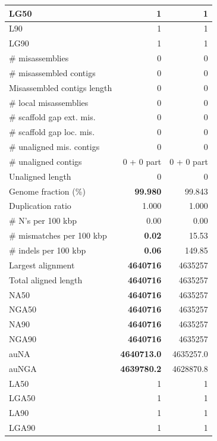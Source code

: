 \documentclass[12pt,a4paper]{article}
\begin{document}
\begin{table}[ht]
\begin{center}
\begin{tabular}{|l*{2}{|r}|}
LG50 & 1 & 1 \\ \hline
L90 & 1 & 1 \\ \hline
LG90 & 1 & 1 \\ \hline
\# misassemblies & 0 & 0 \\ \hline
\# misassembled contigs & 0 & 0 \\ \hline
Misassembled contigs length & 0 & 0 \\ \hline
\# local misassemblies & 0 & 0 \\ \hline
\# scaffold gap ext. mis. & 0 & 0 \\ \hline
\# scaffold gap loc. mis. & 0 & 0 \\ \hline
\# unaligned mis. contigs & 0 & 0 \\ \hline
\# unaligned contigs & 0 + 0 part & 0 + 0 part \\ \hline
Unaligned length & 0 & 0 \\ \hline
Genome fraction (\%) & {\bf 99.980} & 99.843 \\ \hline
Duplication ratio & 1.000 & 1.000 \\ \hline
\# N's per 100 kbp & 0.00 & 0.00 \\ \hline
\# mismatches per 100 kbp & {\bf 0.02} & 15.53 \\ \hline
\# indels per 100 kbp & {\bf 0.06} & 149.85 \\ \hline
Largest alignment & {\bf 4640716} & 4635257 \\ \hline
Total aligned length & {\bf 4640716} & 4635257 \\ \hline
NA50 & {\bf 4640716} & 4635257 \\ \hline
NGA50 & {\bf 4640716} & 4635257 \\ \hline
NA90 & {\bf 4640716} & 4635257 \\ \hline
NGA90 & {\bf 4640716} & 4635257 \\ \hline
auNA & {\bf 4640713.0} & 4635257.0 \\ \hline
auNGA & {\bf 4639780.2} & 4628870.8 \\ \hline
LA50 & 1 & 1 \\ \hline
LGA50 & 1 & 1 \\ \hline
LA90 & 1 & 1 \\ \hline
LGA90 & 1 & 1 \\ \hline
\end{tabular}
\end{center}
\end{table}
\end{document}
